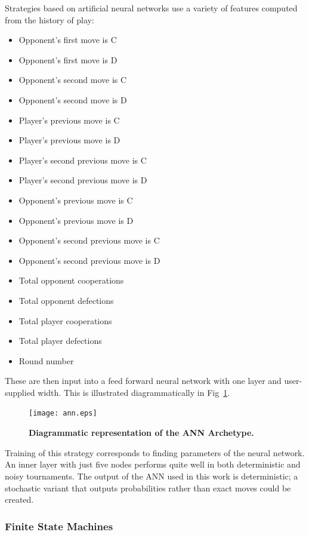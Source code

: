 \documentclass[10pt,letterpaper]{article}
\begin{document}
Strategies based on artificial neural networks use a variety of features
computed from the history of play:

\begin{itemize}
    \item Opponent's first move is C
    \item Opponent's first move is D
    \item Opponent's second move is C
    \item Opponent's second move is D
    \item Player's previous move is C
    \item Player's previous move is D
    \item Player's second previous move is C
    \item Player's second previous move is D
    \item Opponent's previous move is C
    \item Opponent's previous move is D
    \item Opponent's second previous move is C
    \item Opponent's second previous move is D
    \item Total opponent cooperations
    \item Total opponent defections
    \item Total player cooperations
    \item Total player defections
    \item Round number
\end{itemize}

These are then input into a feed forward neural network with one layer and
user-supplied width. This is illustrated diagrammatically in
Fig~\ref{fig:ann}.

\begin{figure}[!hbtp]
    \centering
    \texttt{[image: ann.eps]}
    \caption{\bf Diagrammatic representation of the ANN Archetype.}
    \label{fig:ann}
\end{figure}

Training of this strategy corresponds to finding parameters of the neural
network. An inner layer with just five nodes performs quite well in both deterministic and
noisy tournaments. The output of the ANN used in this work is deterministic;
a stochastic variant that outputs probabilities rather than exact moves could
be created.

\subsubsection*{Finite State Machines}\label{sec:fsm}
\end{document}
